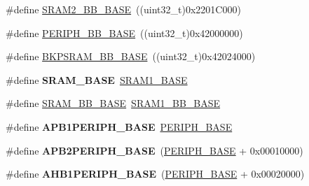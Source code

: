 \begin{DoxyCompactItemize}
\item 
\#define \hyperlink{group___peripheral__memory__map_gac33cb6edadf184ab9860d77089503922}{S\-R\-A\-M2\-\_\-\-B\-B\-\_\-\-B\-A\-S\-E}~((uint32\-\_\-t)0x2201\-C000)
\item 
\#define \hyperlink{group___peripheral__memory__map_gaed7efc100877000845c236ccdc9e144a}{P\-E\-R\-I\-P\-H\-\_\-\-B\-B\-\_\-\-B\-A\-S\-E}~((uint32\-\_\-t)0x42000000)
\item 
\#define \hyperlink{group___peripheral__memory__map_gaee19a30c9fa326bb10b547e4eaf4e250}{B\-K\-P\-S\-R\-A\-M\-\_\-\-B\-B\-\_\-\-B\-A\-S\-E}~((uint32\-\_\-t)0x42024000)
\item 
\hypertarget{group___peripheral__memory__map_ga05e8f3d2e5868754a7cd88614955aecc}{\#define {\bfseries S\-R\-A\-M\-\_\-\-B\-A\-S\-E}~\hyperlink{group___peripheral__memory__map_ga7d0fbfb8894012dbbb96754b95e562cd}{S\-R\-A\-M1\-\_\-\-B\-A\-S\-E}}\label{group___peripheral__memory__map_ga05e8f3d2e5868754a7cd88614955aecc}

\item 
\#define \hyperlink{group___peripheral__memory__map_gad3548b6e2f017f39d399358f3ac98454}{S\-R\-A\-M\-\_\-\-B\-B\-\_\-\-B\-A\-S\-E}~\hyperlink{group___peripheral__memory__map_gac4c4f61082e4b168f29d9cf97dc3ca5c}{S\-R\-A\-M1\-\_\-\-B\-B\-\_\-\-B\-A\-S\-E}
\item 
\hypertarget{group___peripheral__memory__map_ga45666d911f39addd4c8c0a0ac3388cfb}{\#define {\bfseries A\-P\-B1\-P\-E\-R\-I\-P\-H\-\_\-\-B\-A\-S\-E}~\hyperlink{group___peripheral__memory__map_ga9171f49478fa86d932f89e78e73b88b0}{P\-E\-R\-I\-P\-H\-\_\-\-B\-A\-S\-E}}\label{group___peripheral__memory__map_ga45666d911f39addd4c8c0a0ac3388cfb}

\item 
\hypertarget{group___peripheral__memory__map_ga25b99d6065f1c8f751e78f43ade652cb}{\#define {\bfseries A\-P\-B2\-P\-E\-R\-I\-P\-H\-\_\-\-B\-A\-S\-E}~(\hyperlink{group___peripheral__memory__map_ga9171f49478fa86d932f89e78e73b88b0}{P\-E\-R\-I\-P\-H\-\_\-\-B\-A\-S\-E} + 0x00010000)}\label{group___peripheral__memory__map_ga25b99d6065f1c8f751e78f43ade652cb}

\item 
\hypertarget{group___peripheral__memory__map_ga811a9a4ca17f0a50354a9169541d56c4}{\#define {\bfseries A\-H\-B1\-P\-E\-R\-I\-P\-H\-\_\-\-B\-A\-S\-E}~(\hyperlink{group___peripheral__memory__map_ga9171f49478fa86d932f89e78e73b88b0}{P\-E\-R\-I\-P\-H\-\_\-\-B\-A\-S\-E} + 0x00020000)}\label{group___peripheral__memory__map_ga811a9a4ca17f0a50354a9169541d56c4}


\end{DoxyCompactItemize}
